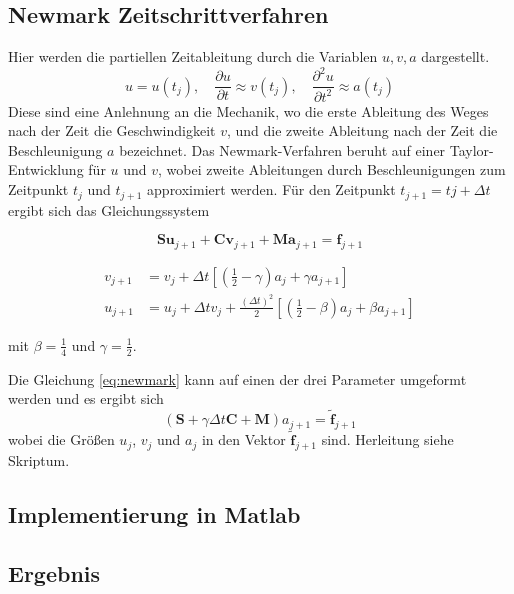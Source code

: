 	\subsection{Newmark Zeitschrittverfahren}
	
	Hier werden die partiellen Zeitableitung durch die Variablen $u, v, a$ dargestellt.
	\[
	u = u(t_j) , \quad 
	\frac{\partial u}{\partial t} \approx v(t_j) , \quad
	\frac{\partial^2 u}{\partial t^2} \approx a (t_j)
	\]
	Diese sind eine Anlehnung an die Mechanik, wo die erste Ableitung des Weges nach der Zeit die Geschwindigkeit $v$, und die zweite Ableitung nach der Zeit die Beschleunigung $a$ bezeichnet.
	Das Newmark-Verfahren beruht auf einer Taylor-Entwicklung für $u$ und $v$, wobei
zweite Ableitungen durch Beschleunigungen zum Zeitpunkt $t_j$ und $t_{j+1}$ approximiert werden. Für den Zeitpunkt $t_{j+1} = tj + \Delta t$ ergibt sich das Gleichungssystem
	
	\begin{equation}
	\mathbf{Su}_{j+1} + 	\mathbf{Cv}_{j+1} +	\mathbf{Ma}_{j+1} = 	\mathbf{f}_{j+1}
	\label{eq:newmark}
	\end{equation}
	
	\begin{align}
		v_{j+1} &= v_j + \Delta t  [(\frac{1}{2}-\gamma)a_j + \gamma a_{j+1}] \\
		u_{j+1} &= u_j + \Delta t v_j + \frac{(\Delta t)^2}{2} [(\frac{1}{2}-\beta)a_j + \beta a_{j+1}]
	\end{align}
	
	mit $\beta = \frac{1}{4}$ und $\gamma = \frac{1}{2}$.
	
	Die Gleichung \ref{eq:newmark} kann auf einen der drei Parameter umgeformt werden und es ergibt sich
	\begin{equation}
	(\mathbf{S} + \gamma \Delta t	\mathbf{C} +	\mathbf{M})a_{j+1} = 	\mathbf{\tilde f}_{j+1}
	\label{eq:newmark-final}
	\end{equation}
	wobei die Größen $u_j$, $v_j$ und $a_j$ in den Vektor $\mathbf{\tilde f}_{j+1}$ sind. Herleitung siehe Skriptum.
	
	
	\subsection{Implementierung in Matlab}
		
	
	
	\subsection{Ergebnis}
	
